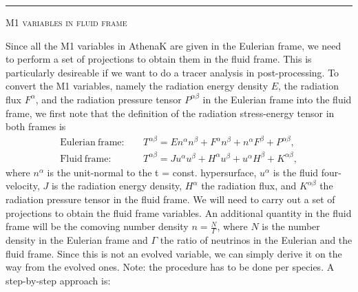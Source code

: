 \documentclass{article}
\newcommand{\step}[1]{%
  \par\medskip\noindent
  {\color{stepfg}\rule[-0.15ex]{2pt}{1.5ex}\hspace{0.5em}\scshape #1}%
  \hspace{0.75em}\ignorespaces}
\begin{document}
\step{M1 variables in fluid frame}
Since all the M1 variables in AthenaK are given in the Eulerian frame, we need to perform a set of
projections to obtain them in the fluid frame. This is particularly desireable if we want to do a
tracer analysis in post-processing. To convert the M1 variables, namely the radiation energy density $E$, the radiation flux $F^{\alpha}$,
and the radiation pressure tensor $P^{\alpha\beta}$ in the Eulerian frame into the fluid frame, we first
note that the definition of the radiation stress-energy tensor in both frames is
\begin{align}
  \mathrm{Eulerian\ frame:}&\quad T^{\alpha\beta}=En^{\alpha}n^{\beta}+F^{\alpha}n^{\beta}+n^{\alpha}F^{\beta}+P^{\alpha\beta},\\
  \mathrm{Fluid\ frame:}&\quad T^{\alpha\beta}=Ju^{\alpha}u^{\beta}+H^{\alpha}u^{\beta}+u^{\alpha}H^{\beta}+K^{\alpha\beta},
\end{align}
where $n^{\alpha}$ is the unit-normal to the t = const. hypersurface, $u^{\alpha}$ is the fluid four-velocity,
$J$ is the radiation energy density, $H^{\alpha}$ the radiation flux, and $K^{\alpha\beta}$ the radiation pressure
tensor in the fluid frame. We will need to carry out a set of projections to obtain the fluid frame variables. An additional
quantity in the fluid frame will be the comoving number density $n=\frac{N}{\Gamma}$, where $N$ is the number density
in the Eulerian frame and $\Gamma$ the ratio of neutrinos in the Eulerian and the fluid frame. Since this is not an evolved
variable, we can simply derive it on the way from the evolved ones. Note: the procedure has to be done per species.
A step-by-step approach is:
\end{document}
